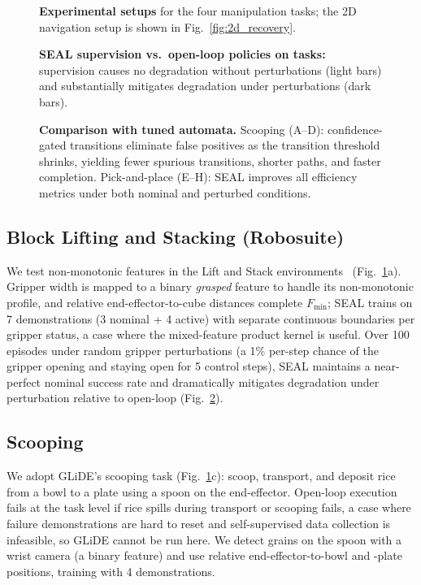 \begin{figure}[t]
\centering

\caption{\textbf{Experimental setups} for the four manipulation tasks; the 2D navigation setup is shown in Fig.~\ref{fig:2d_recovery}.}
\label{fig:compilation}
\end{figure}

\begin{figure}[htbp]
\centering

\caption{\textbf{SEAL supervision vs.\ open-loop policies on tasks:} supervision causes no degradation without perturbations (light bars) and substantially mitigates degradation under perturbations (dark bars).}
\label{fig:robosuite_wiping}
\end{figure}

\begin{figure}[t]
\centering

\caption{\textbf{Comparison with tuned automata.} Scooping (A--D): confidence-gated transitions eliminate false positives as the transition threshold shrinks, yielding fewer spurious transitions, shorter paths, and faster completion. Pick-and-place (E--H): SEAL improves all efficiency metrics under both nominal and perturbed conditions.}
\label{fig:scooping_pnp}
\end{figure}

\subsection{Block Lifting and Stacking (Robosuite)}
We test non-monotonic features in the Lift and Stack environments~\cite{robosuite2020} (Fig.~\ref{fig:compilation}a). Gripper width is mapped to a binary \textit{grasped} feature to handle its non-monotonic profile, and relative end-effector-to-cube distances complete $F_{\min}$; SEAL trains on 7 demonstrations (3 nominal + 4 active) with separate continuous boundaries per gripper status, a case where the mixed-feature product kernel is useful. Over 100 episodes under random gripper perturbations (a 1\% per-step chance of the gripper opening and staying open for 5 control steps), SEAL maintains a near-perfect nominal success rate and dramatically mitigates degradation under perturbation relative to open-loop (Fig.~\ref{fig:robosuite_wiping}).

\subsection{Scooping}
\label{sec:scooping}
We adopt GLiDE's scooping task (Fig.~\ref{fig:compilation}c): scoop, transport, and deposit rice from a bowl to a plate using a spoon on the end-effector. Open-loop execution fails at the task level if rice spills during transport or scooping fails, a case where failure demonstrations are hard to reset and self-supervised data collection is infeasible, so GLiDE cannot be run here. We detect grains on the spoon with a wrist camera (a binary feature) and use relative end-effector-to-bowl and -plate positions, training with 4 demonstrations.

